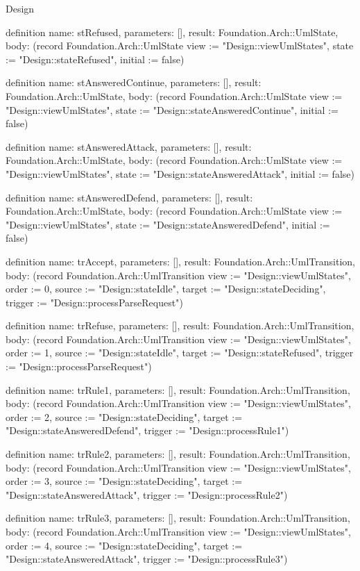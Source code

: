 \begin{lexlean}{Design}
\begin{semanticmodule}
definition{
  name: stRefused,
  parameters: [],
  result: Foundation.Arch::UmlState,
  body: (record Foundation.Arch::UmlState {view := "Design::viewUmlStates", state := "Design::stateRefused", initial := false})
}

definition{
  name: stAnsweredContinue,
  parameters: [],
  result: Foundation.Arch::UmlState,
  body: (record Foundation.Arch::UmlState {view := "Design::viewUmlStates", state := "Design::stateAnsweredContinue", initial := false})
}

definition{
  name: stAnsweredAttack,
  parameters: [],
  result: Foundation.Arch::UmlState,
  body: (record Foundation.Arch::UmlState {view := "Design::viewUmlStates", state := "Design::stateAnsweredAttack", initial := false})
}

definition{
  name: stAnsweredDefend,
  parameters: [],
  result: Foundation.Arch::UmlState,
  body: (record Foundation.Arch::UmlState {view := "Design::viewUmlStates", state := "Design::stateAnsweredDefend", initial := false})
}

definition{
  name: trAccept,
  parameters: [],
  result: Foundation.Arch::UmlTransition,
  body: (record Foundation.Arch::UmlTransition {view := "Design::viewUmlStates", order := 0, source := "Design::stateIdle", target := "Design::stateDeciding", trigger := "Design::processParseRequest"})
}

definition{
  name: trRefuse,
  parameters: [],
  result: Foundation.Arch::UmlTransition,
  body: (record Foundation.Arch::UmlTransition {view := "Design::viewUmlStates", order := 1, source := "Design::stateIdle", target := "Design::stateRefused", trigger := "Design::processParseRequest"})
}

definition{
  name: trRule1,
  parameters: [],
  result: Foundation.Arch::UmlTransition,
  body: (record Foundation.Arch::UmlTransition {view := "Design::viewUmlStates", order := 2, source := "Design::stateDeciding", target := "Design::stateAnsweredDefend", trigger := "Design::processRule1"})
}

definition{
  name: trRule2,
  parameters: [],
  result: Foundation.Arch::UmlTransition,
  body: (record Foundation.Arch::UmlTransition {view := "Design::viewUmlStates", order := 3, source := "Design::stateDeciding", target := "Design::stateAnsweredAttack", trigger := "Design::processRule2"})
}

definition{
  name: trRule3,
  parameters: [],
  result: Foundation.Arch::UmlTransition,
  body: (record Foundation.Arch::UmlTransition {view := "Design::viewUmlStates", order := 4, source := "Design::stateDeciding", target := "Design::stateAnsweredAttack", trigger := "Design::processRule3"})
}


\end{semanticmodule}
\end{lexlean}

